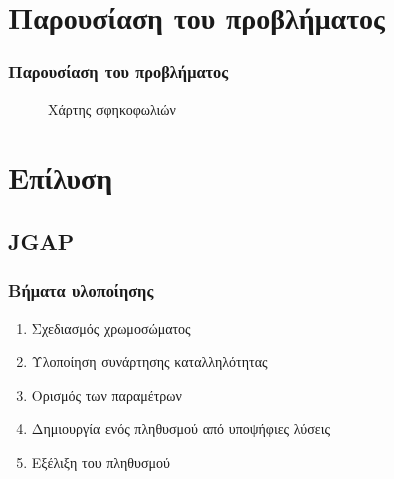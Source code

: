 \documentclass[xetex,mathserif,serif,14pt]{beamer}
\begin{document}

\section{Παρουσίαση του προβλήματος}

\begin{frame}
\frametitle{Παρουσίαση του προβλήματος}
\begin{figure}[!t]
    \centering
    \caption{Χάρτης σφηκοφωλιών}
    \label{fig_waspNestsMap}
\end{figure}
\end{frame}


\section{Επίλυση}

\subsection{JGAP}

\begin{frame}
\frametitle{Βήματα υλοποίησης}
\begin{enumerate}
  \item Σχεδιασμός χρωμοσώματος
  \item Υλοποίηση συνάρτησης καταλληλότητας
  \item Ορισμός των παραμέτρων
  \item Δημιουργία ενός πληθυσμού από υποψήφιες λύσεις
  \item Εξέλιξη του πληθυσμού
\end{enumerate}
\end{frame}
\end{document}
